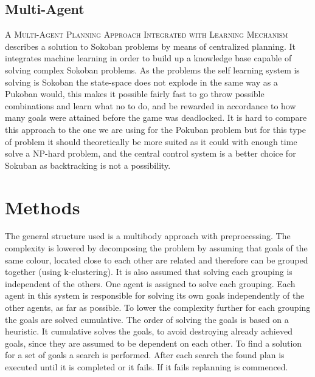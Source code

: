 \documentclass[letterpaper]{article}
\begin{document}
	\subsection{Multi-Agent}
		\textsc{A Multi-Agent Planning Approach Integrated with Learning Mechanism} ~\cite{Multi-Agent} describes a solution to Sokoban problems by means of centralized planning. It integrates machine learning in order to build up a knowledge base capable of solving complex Sokoban problems. As the problems the self learning system is solving is Sokoban the state-space does not explode in the same way as a Pukoban would, this makes it possible fairly fast to go throw possible combinations and learn what no to do, and be rewarded in accordance to how many goals were attained before the game was deadlocked. It is hard to compare this approach to the one we are using for the Pokuban problem but for this type of problem it should theoretically be more suited as it could with enough time solve a NP-hard problem, and the central control system is a better choice for Sokuban as backtracking is not a possibility.

\section{Methods}
%		
%		
%		
	The general structure used is a multibody approach with preprocessing. The complexity is lowered by decomposing the problem by assuming that goals of the same colour, located close to each other are related and therefore can be grouped together (using k-clustering). It is also assumed that solving each grouping is independent of the others. One agent is assigned to solve each grouping. Each agent in this system is responsible for solving its own goals independently of the other agents, as far as possible. 
	To lower the complexity further for each grouping the goals are solved cumulative. The order of solving the goals is based on a heuristic. It cumulative solves the goals, to avoid destroying already achieved goals, since they are assumed to be dependent on each other. To find a solution for a set of goals a search is performed. After each search the found plan is executed until it is completed or it fails. If it fails replanning is commenced.
\end{document}
